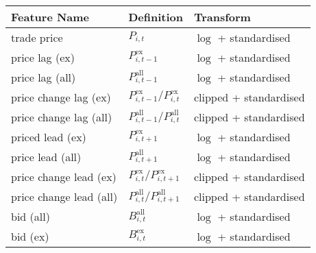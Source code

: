 \begin{table}[H]
    \centering
    \begin{threeparttable}
        \begin{tabular}{@{}lll@{}}
            \toprule
            Feature Name            & Definition                                                                                       & Transform              \\ \midrule
            trade price             & $P_{i, t}$                                                                                       & $\log$ + standardised  \\
            price lag (ex)          & $P_{i, t-1}^{\text{ex}}$\tnote{*}                                                                & $\log$ + standardised  \\
            price lag (all)         & $P_{i, t-1}^{\text{all}}$\tnote{*}                                                               & $\log$ + standardised  \\
            price change lag (ex)   & $P_{i, t-1}^{\text{ex}}/P_{i, t}^{\text{ex}}$\tnote{*}                                           & clipped + standardised \\
            price change lag (all)  & $P_{i, t-1}^{\text{all}}/P_{i, t}^{\text{all}}$\tnote{*}                                         & clipped + standardised \\
            priced lead (ex)        & $P_{i, t+1}^{\text{ex}}$\tnote{*}                                                                & $\log$ + standardised  \\
            price lead (all)        & $P_{i, t+1}^{\text{all}}$\tnote{*}                                                               & $\log$ + standardised  \\
            price change lead (ex)  & $P_{i, t}^{\text{ex}}/P_{i, t+1}^{\text{ex}}$\tnote{*}                                           & clipped + standardised \\
            price change lead (all) & $P_{i, t}^{\text{all}}/P_{i, t+1}^{\text{all}}$\tnote{*}                                         & clipped + standardised \\
            bid (all)               & $B_{i, t}^{\text{all}}$                                                                          & $\log$ + standardised  \\
            bid (ex)                & $B_{i, t}^{\text{ex}}$                                                                           & $\log$ + standardised  \\

\end{tabular}
\end{threeparttable}
\end{table}
